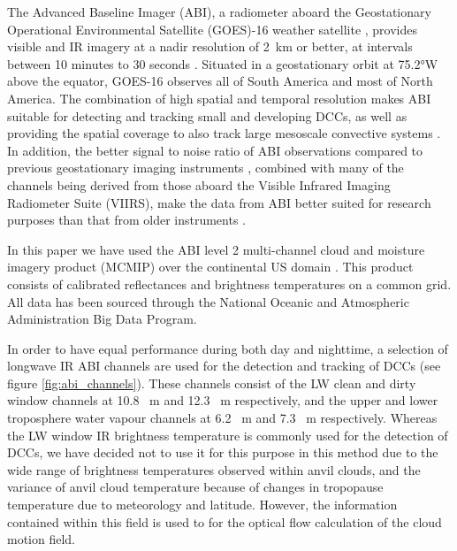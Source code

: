 The Advanced Baseline Imager (ABI), a radiometer aboard the Geostationary Operational Environmental Satellite (GOES)-16 weather satellite \citep{schmit_closer_2016}, provides visible and IR imagery at a nadir resolution of 2~\unit{km} or better, at intervals between 10 minutes to 30 seconds \citep{schmit_chapter_2020}.
Situated in a geostationary orbit at 75.2°W above the equator, GOES-16 observes all of South America and most of North America.
The combination of high spatial and temporal resolution makes ABI suitable for detecting and tracking small and developing DCCs, as well as providing the spatial coverage to also track large mesoscale convective systems \citep{heikenfeld_tobac_2019}.
In addition, the better signal to noise ratio of ABI observations compared to previous geostationary imaging instruments \citep{iacovazzi_goes-16_2020}, combined with many of the channels being derived from those aboard the Visible Infrared Imaging Radiometer Suite (VIIRS), make the data from ABI better suited for research purposes than that from older instruments \citep{heidinger_chapter_2020}.

In this paper we have used the ABI level 2 multi-channel cloud and moisture imagery product (MCMIP) over the continental US domain \citep{schmit_chapter_2020}.
This product consists of calibrated reflectances and brightness temperatures on a common grid.
All data has been sourced through the National Oceanic and Atmospheric Administration Big Data Program.

In order to have equal performance during both day and nighttime, a selection of longwave IR ABI channels are used for the detection and tracking of DCCs (see figure \ref{fig:abi_channels}). 
These channels consist of the LW clean and dirty window channels at 10.8 \unit{\mu m} and 12.3 \unit{\mu m} respectively, and the upper and lower troposphere water vapour channels at 6.2 \unit{\mu m} and 7.3 \unit{\mu m} respectively.
Whereas the LW window IR brightness temperature is commonly used for the detection of DCCs, we have decided not to use it for this purpose in this method due to the wide range of brightness temperatures observed within anvil clouds, and the variance of anvil cloud temperature because of changes in tropopause temperature due to meteorology and latitude.
However, the information contained within this field is used to for the optical flow calculation of the cloud motion field.

